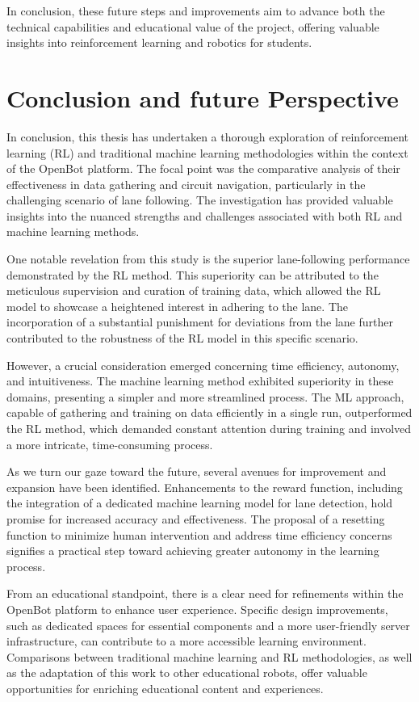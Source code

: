 \documentclass[12pt]{report}
\begin{document}
In conclusion, these future steps and improvements aim to advance both the technical capabilities and educational value of the project, offering valuable insights into reinforcement learning and robotics for students.

\chapter{Conclusion and future Perspective}
\label{sub:Conclusion}
In conclusion, this thesis has undertaken a thorough exploration of reinforcement learning (RL) and traditional machine learning methodologies within the context of the OpenBot platform. The focal point was the comparative analysis of their effectiveness in data gathering and circuit navigation, particularly in the challenging scenario of lane following. The investigation has provided valuable insights into the nuanced strengths and challenges associated with both RL and machine learning methods.

One notable revelation from this study is the superior lane-following performance demonstrated by the RL method. This superiority can be attributed to the meticulous supervision and curation of training data, which allowed the RL model to showcase a heightened interest in adhering to the lane. The incorporation of a substantial punishment for deviations from the lane further contributed to the robustness of the RL model in this specific scenario.

However, a crucial consideration emerged concerning time efficiency, autonomy, and intuitiveness. The machine learning method exhibited superiority in these domains, presenting a simpler and more streamlined process. The ML approach, capable of gathering and training on data efficiently in a single run, outperformed the RL method, which demanded constant attention during training and involved a more intricate, time-consuming process.

As we turn our gaze toward the future, several avenues for improvement and expansion have been identified. Enhancements to the reward function, including the integration of a dedicated machine learning model for lane detection, hold promise for increased accuracy and effectiveness. The proposal of a resetting function to minimize human intervention and address time efficiency concerns signifies a practical step toward achieving greater autonomy in the learning process.

From an educational standpoint, there is a clear need for refinements within the OpenBot platform to enhance user experience. Specific design improvements, such as dedicated spaces for essential components and a more user-friendly server infrastructure, can contribute to a more accessible learning environment. Comparisons between traditional machine learning and RL methodologies, as well as the adaptation of this work to other educational robots, offer valuable opportunities for enriching educational content and experiences.
\end{document}

